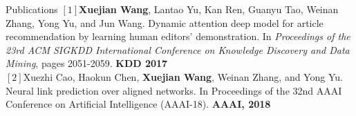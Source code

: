\documentclass{resume} %
\begin{document}
\begin{rSection}{Publications}
$[1]$\textbf{Xuejian Wang}, Lantao Yu, Kan Ren, Guanyu Tao, Weinan Zhang, Yong Yu, and Jun Wang. Dynamic attention deep model for article recommendation by learning human editors' demonstration. In \emph{Proceedings of the 23rd ACM SIGKDD International Conference on Knowledge Discovery and Data Mining}, pages 2051-2059. \textbf{KDD 2017} \\
$[2]$Xuezhi Cao, Haokun Chen, \textbf{Xuejian Wang}, Weinan Zhang, and Yong Yu. Neural link prediction over aligned networks. In Proceedings of the 32nd AAAI Conference on Artificial Intelligence (AAAI-18). \textbf{AAAI, 2018}
\end{rSection}
\end{document}
